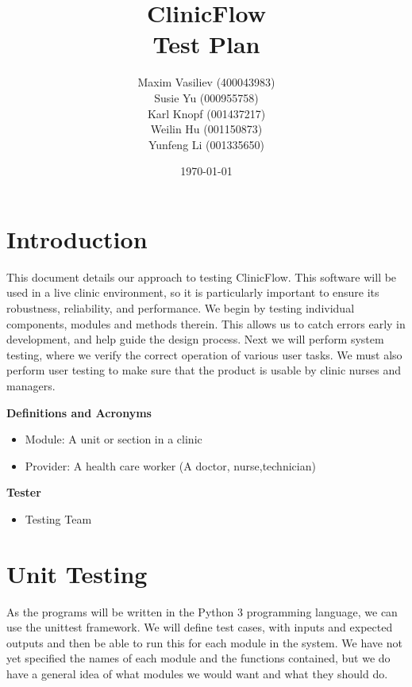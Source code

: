 \documentclass[12pt]{article}
\title{
ClinicFlow
\\\vspace{10mm}
\Large \textbf{Test Plan}
\vspace{40mm}
}
\author{ Maxim Vasiliev (400043983)
\\
Susie Yu \quad (000955758)
\\
Karl Knopf \quad (001437217)
\\
Weilin Hu \quad (001150873)
\\
Yunfeng Li \quad (001335650)
}
\date{\today}
\begin{document}
\maketitle
\newpage
\tableofcontents
\newpage
{}
\setlength\parindent{0pt}




\section{Introduction}


This document details our approach to testing ClinicFlow. This software will be used in a live clinic environment, so it is particularly important to ensure its robustness, reliability, and performance. We begin by testing individual components, modules and methods therein. This allows us to catch errors early in development, and help guide the design process. Next we will perform system testing, where we verify the correct operation of various user tasks. We must also perform user testing to make sure that the product is usable by clinic nurses and managers.\\

\quad


\textbf{Definitions and Acronyms} 

\vspace{-5pt}
\begin{itemize}
\setlength{\parskip}{4pt}
\setlength{\itemsep}{2pt}
\item Module: A unit or section in a clinic
\item Provider: A health care worker (A doctor, nurse,technician) 
\end{itemize}

\textbf{Tester} 

\vspace{-5pt}
\begin{itemize}
\setlength{\parskip}{4pt}
\setlength{\itemsep}{2pt}
\item Testing Team
\end{itemize}



\quad

\quad

\quad

\section{Unit Testing}

As the programs will be written in the Python 3 programming language, we can use the unittest framework. We will define test cases, with inputs and expected outputs and then be able to run this for each module in the system. We have not yet specified the names of each module and the functions contained, but we do have a general idea of what modules we would want and what they should do. 
\end{document}
